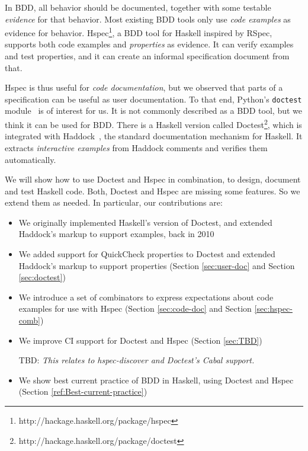 \documentclass[preprint]{sigplanconf}
\begin{document}
In BDD, all behavior should be documented, together with some testable
\emph{evidence} for that behavior.  Most existing BDD tools only use
\emph{code examples} as evidence for behavior.
Hspec\footnote{%
http://hackage.haskell.org/package/hspec},
a BDD tool for Haskell inspired by RSpec, supports
both code examples and \emph{properties} as evidence.
It can verify examples and test properties, and it can create an
informal specification document from that.

Hspec is thus useful for \emph{code documentation}, but we observed that parts
of a specification can be useful as user documentation. To that end,
Python's {\tt doctest} module~\cite{doctest} is of interest for us.
It is not commonly described as a BDD tool, but we think it can be
used for BDD.
There is a Haskell version called Doctest\footnote{%
http://hackage.haskell.org/package/doctest}, which is integrated with Haddock~\cite{haddock},
the standard documentation mechanism for Haskell.
It extracts \emph{interactive examples} from Haddock comments and
verifies them automatically.

We will show how to use Doctest and Hspec in combination, to design,
document and test Haskell code.
Both, Doctest and Hspec are missing some features.  So we extend them
as needed.  In particular, our contributions are:

\begin{itemize}
\item
    We originally implemented Haskell's version of Doctest, and
    extended Haddock's markup to support examples, back in 2010
\item
    We added support for QuickCheck properties to Doctest and extended
    Haddock's markup to support properties
    (Section
    \ref{sec:user-doc} and Section \ref{sec:doctest})

\item
    We introduce a set of combinators to express expectations about
    code examples for use with Hspec (Section \ref{sec:code-doc} and
    Section \ref{sec:hspec-comb})

\item
    We improve CI support for Doctest and Hspec (Section
    \ref{sec:TBD})

    TBD:
    \emph{This relates to hspec-discover and Doctest's Cabal support.}

\item
    We show best current practice of BDD in Haskell, using Doctest and
    Hspec (Section \ref{ref:Best-current-practice})

\end{itemize}
\end{document}
